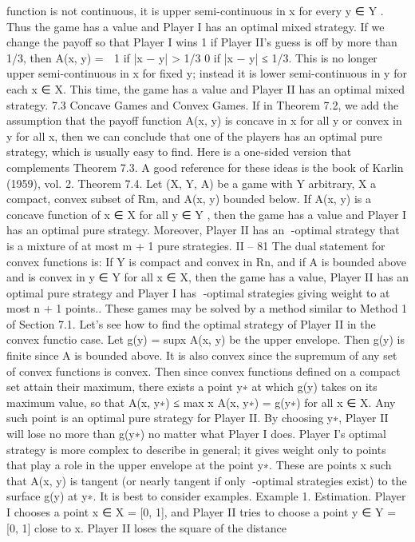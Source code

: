 function is not continuous, it is upper semi-continuous in x for every y ∈ Y . Thus the
game has a value and Player I has an optimal mixed strategy.
If we change the payoff so that Player I wins 1 if Player II’s guess is off by more than
1/3, then A(x, y) =  1 if |x − y| > 1/3
0 if |x − y| ≤ 1/3. This is no longer upper semi-continuous in x
for fixed y; instead it is lower semi-continuous in y for each x ∈ X. This time, the game
has a value and Player II has an optimal mixed strategy.
7.3 Concave Games and Convex Games. If in Theorem 7.2, we add the assumption
that the payoff function A(x, y) is concave in x for all y or convex in y for all x, then
we can conclude that one of the players has an optimal pure strategy, which is usually easy
to find. Here is a one-sided version that complements Theorem 7.3. A good reference for
these ideas is the book of Karlin (1959), vol. 2.
Theorem 7.4. Let (X, Y, A) be a game with Y arbitrary, X a compact, convex subset of
Rm, and A(x, y) bounded below. If A(x, y) is a concave function of x ∈ X for all y ∈ Y ,
then the game has a value and Player I has an optimal pure strategy. Moreover, Player II
has an -optimal strategy that is a mixture of at most m + 1 pure strategies.
II – 81
The dual statement for convex functions is: If Y is compact and convex in Rn, and
if A is bounded above and is convex in y ∈ Y for all x ∈ X, then the game has a value,
Player II has an optimal pure strategy and Player I has -optimal strategies giving weight
to at most n + 1 points..
These games may be solved by a method similar to Method 1 of Section 7.1. Let’s
see how to find the optimal strategy of Player II in the convex functio case. Let g(y) =
supx A(x, y) be the upper envelope. Then g(y) is finite since A is bounded above. It is also
convex since the supremum of any set of convex functions is convex. Then since convex
functions defined on a compact set attain their maximum, there exists a point y∗ at which
g(y) takes on its maximum value, so that
A(x, y∗) ≤ max x A(x, y∗) = g(y∗) for all x ∈ X.
Any such point is an optimal pure strategy for Player II. By choosing y∗, Player II will
lose no more than g(y∗) no matter what Player I does. Player I’s optimal strategy is
more complex to describe in general; it gives weight only to points that play a role in the
upper envelope at the point y∗. These are points x such that A(x, y) is tangent (or nearly
tangent if only -optimal strategies exist) to the surface g(y) at y∗. It is best to consider
examples.
Example 1. Estimation. Player I chooses a point x ∈ X = [0, 1], and Player II
tries to choose a point y ∈ Y = [0, 1] close to x. Player II loses the square of the distance
